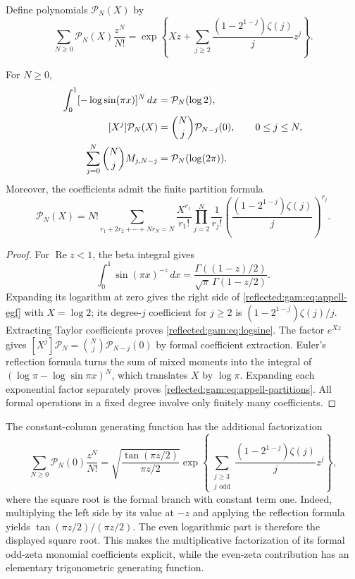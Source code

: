 Define polynomials $\mathcal P_N(X)$ by
\begin{equation}\label{reflected:gam:eq:appell-egf}
 \sum_{N\ge0}\mathcal P_N(X)\frac{z^N}{N!}
 =\exp\left\{Xz+\sum_{j\ge2}
       \frac{(1-2^{1-j})\zeta(j)}jz^j\right\}.
\end{equation}
\begin{proposition}
\label{reflected:gam:prop:appell}
For $N\ge0$,
\begin{align}
 \int_0^1[-\log\sin(\pi x)]^N\,dx&=\mathcal P_N(\log2),\label{reflected:gam:eq:logsine}\\
 [X^j]\mathcal P_N(X)&=\binom Nj \mathcal P_{N-j}(0),\qquad 0\le j\le N,\notag\\
 \sum_{j=0}^N\binom Nj M_{j,N-j}&=\mathcal P_N(\log(2\pi)).\notag
\end{align}
Moreover, the coefficients admit the finite partition formula
\begin{equation}\label{reflected:gam:eq:appell-partitions}
 \mathcal P_N(X)=N!\!\sum_{r_1+2r_2+\cdots+Nr_N=N}
 \frac{X^{r_1}}{r_1!}
 \prod_{j=2}^N\frac1{r_j!}
 \left(\frac{(1-2^{1-j})\zeta(j)}j\right)^{r_j}.
\end{equation}
\end{proposition}
\begin{proof}
For $\operatorname{Re}z<1$, the beta integral gives
\[
 \int_0^1\sin(\pi x)^{-z}\,dx
 =\frac{\Gamma((1-z)/2)}{\sqrt\pi\,\Gamma(1-z/2)}.
\]
Expanding its logarithm at zero gives the right side of
\eqref{reflected:gam:eq:appell-egf} with $X=\log2$; its degree-$j$ coefficient
for $j\ge2$ is $(1-2^{1-j})\zeta(j)/j$.
Extracting Taylor coefficients proves \eqref{reflected:gam:eq:logsine}.
The factor $e^{Xz}$ gives $[X^j]\mathcal P_N=\binom Nj\mathcal P_{N-j}(0)$ by
formal coefficient extraction.  Euler's reflection formula turns
the sum of mixed moments into the integral of
$(\log\pi-\log\sin\pi x)^N$, which translates $X$ by $\log\pi$.
Expanding each exponential factor separately proves
\eqref{reflected:gam:eq:appell-partitions}.  All formal operations in a fixed
degree involve only finitely many coefficients.
\end{proof}

The constant-column generating function has the additional factorization
\begin{equation}\label{reflected:gam:eq:even-odd-factor}
 \sum_{N\ge0}\mathcal P_N(0)\frac{z^N}{N!}
 =\sqrt{\frac{\tan(\pi z/2)}{\pi z/2}}
 \exp\left\{\sum_{\substack{j\ge3\\j\text{ odd}}}
       \frac{(1-2^{1-j})\zeta(j)}jz^j\right\},
\end{equation}
where the square root is the formal branch with constant term one.
Indeed, multiplying the left side by its value at $-z$ and applying
the reflection formula yields $\tan(\pi z/2)/(\pi z/2)$.
The even logarithmic part is therefore the displayed square root.
This makes the multiplicative factorization of its formal odd-zeta
monomial coefficients explicit, while the even-zeta contribution has
an elementary trigonometric generating function.

